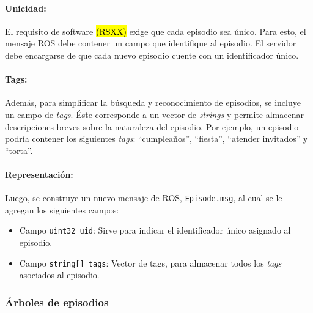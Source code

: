 \paragraph{Unicidad:}
El requisito de software \hl{(RSXX)} exige que cada episodio sea único. Para esto, el mensaje ROS debe contener un campo que identifique al episodio. El servidor debe encargarse de que cada nuevo episodio cuente con un identificador único.

\paragraph{Tags:}
Además, para simplificar la búsqueda y reconocimiento de episodios, se incluye un campo de \textit{tags}. Éste corresponde a un vector de \textit{strings} y permite almacenar descripciones breves sobre la naturaleza del episodio. Por ejemplo, un episodio podría contener los siguientes \textit{tags}: ``cumpleaños'', ``fiesta'', ``atender invitados'' y ``torta''.

\paragraph{Representación:}
Luego, se construye un nuevo mensaje de ROS, \texttt{Episode.msg}, al cual se le agregan los siguientes campos:
\begin{itemize}
\item Campo \texttt{uint32 uid}: Sirve para indicar el identificador único asignado al episodio.
\item Campo \texttt{string[] tags}: Vector de tags, para almacenar todos los \textit{tags} asociados al episodio.
\end{itemize}


 
\subsubsection{Árboles de episodios}



